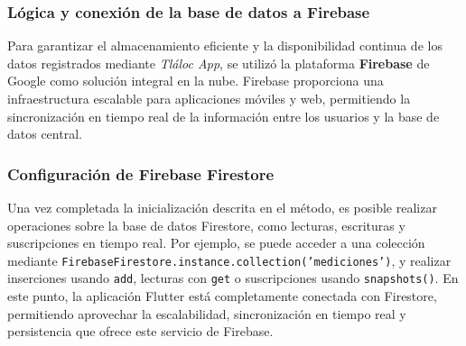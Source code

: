 \begin{table}[h!]
    \centering
    \caption{Funciones Clave de Firebase en el Código}
    \label{tabt2}
    \end{table}






\subsubsection{Lógica y conexión de la base de datos a Firebase}

 

Para garantizar el almacenamiento eficiente y la disponibilidad continua de los datos registrados mediante \textit{Tláloc App}, se utilizó la plataforma \textbf{Firebase} de Google como solución integral en la nube. Firebase proporciona una infraestructura escalable para aplicaciones móviles y web, permitiendo la sincronización en tiempo real de la información entre los usuarios y la base de datos central.

\subsubsection*{Configuración de Firebase Firestore}

Una vez completada la inicialización descrita en el método, es posible realizar operaciones sobre la base de datos Firestore, como lecturas, escrituras y suscripciones en tiempo real. Por ejemplo, se puede acceder a una colección mediante \texttt{FirebaseFirestore.instance.collection('mediciones')}, y realizar inserciones usando \texttt{add}, lecturas con \texttt{get} o suscripciones usando \texttt{snapshots()}. En este punto, la aplicación Flutter está completamente conectada con Firestore, permitiendo aprovechar la escalabilidad, sincronización en tiempo real y persistencia que ofrece este servicio de Firebase.




